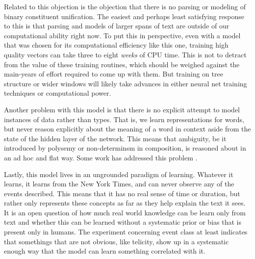 \documentclass[11pt,letterpaper]{article}
\begin{document}
Related to this objection is the objection that there is no parsing or modeling of
binary constituent unification.
The easiest and perhaps least satisfying response to this is that parsing and models
of larger spans of text are outside of our computational ability right now. To put this
in perspective, even with a model that was chosen for its computational efficiency like
this one, training high quality vectors can take three \cite{rami} to
eight \cite{DBLP:journals/corr/abs-1301-3781} {\em weeks} of CPU time.
This is not to detract from the value of these training routines, which should be weighed
against the main-years of effort required to come up with them.
But training on tree structure or wider windows will likely take advances in either
neural net training techniques or computational power.



Another problem with this model is that there is no explicit attempt to model
instances of data rather than types. That is, we learn representations for
words, but never reason explicitly about the meaning of a word in context aside
from the state of the hidden layer of the network. 
This means that ambiguity, be it introduced by polysemy or non-determinsm in
composition, is reasoned about in an ad hoc and flat way.
Some work has addressed this problem \cite{multiplePrototypes1,multiplePrototypes2}.





Lastly, this model lives in an ungrounded paradigm of learning. Whatever it learns,
it learns from the New York Times, and can never observe any of the events described.
This means that it has no real sense of time or duration, but rather only represents
these concepts as far as they help explain the text it sees.
It is an open question of how much real world knowledge can be learn only from text
and whether this can be learned without a systematic prior or bias that is present only in humans.
The experiment concerning event class at least indicates that somethings that are
not obvious, like telicity, show up in a systematic enough way that the model can learn
something correlated with it.







%
%
%
\end{document}
